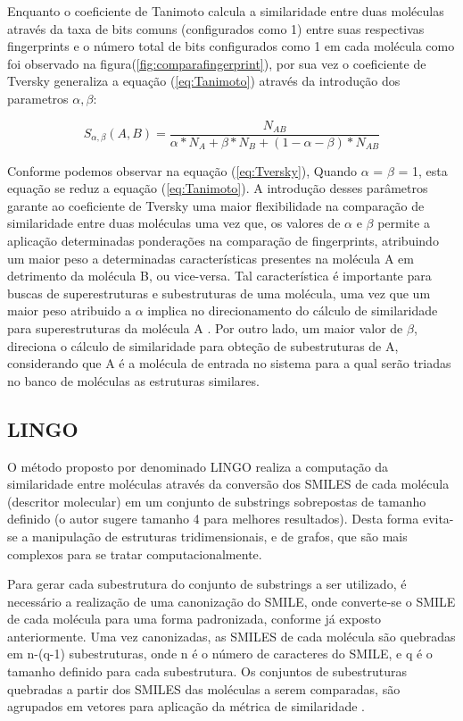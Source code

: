 Enquanto o coeficiente de Tanimoto calcula a similaridade entre duas moléculas através da taxa de bits comuns (configurados como 1) entre suas respectivas fingerprints   e o número total de bits configurados como 1 em cada molécula como foi observado na figura(\ref{fig:comparafingerprint}), por sua vez o coeficiente de Tversky generaliza a equação (\ref{eq:Tanimoto}) através da introdução dos parametros $\alpha,\beta$:


\begin{equation}
S_{\alpha,\beta}(A,B) =\frac{N_{AB}}{\alpha*N_{A}+\beta*N_{B}+(1-\alpha-\beta)*N_{AB}}
\label{eq:Tversky}
\end{equation}

Conforme podemos observar na equação (\ref{eq:Tversky}),  Quando $\alpha$ = $\beta$ = 1, esta equação se reduz a equação (\ref{eq:Tanimoto}). A introdução desses parâmetros garante ao coeficiente de Tversky uma maior flexibilidade na comparação de similaridade entre duas moléculas uma vez que, os valores de $\alpha$ e $\beta$ permite a aplicação determinadas ponderações na comparação de fingerprints, atribuindo um maior peso a determinadas características presentes na molécula A em detrimento da molécula B, ou vice-versa. Tal característica é importante para buscas de superestruturas e subestruturas de uma molécula, uma vez que um maior peso atribuido a $\alpha$ implica no direcionamento do cálculo de similaridade para superestruturas da molécula A \cite{swamidass2007bounds}. Por outro lado, um maior valor de $\beta$, direciona o cálculo de similaridade para obteção de subestruturas de A, considerando que A é a molécula de entrada no sistema para a qual serão triadas no banco de moléculas as estruturas similares.  

\subsection{LINGO}
O método proposto por \cite{vidal2005lingo} denominado LINGO realiza a computação da similaridade entre moléculas através da conversão dos SMILES de cada molécula (descritor molecular) em um conjunto de substrings sobrepostas de tamanho definido (o autor sugere tamanho 4 para melhores resultados). Desta forma evita-se a manipulação de estruturas tridimensionais, e de grafos, que são mais complexos para se tratar computacionalmente.

Para gerar cada subestrutura do conjunto de substrings a ser utilizado, é necessário a
realização de uma canonização do SMILE, onde converte-se o SMILE de cada molécula para 
uma forma padronizada, conforme já exposto anteriormente. Uma vez canonizadas, as 
SMILES de cada molécula são quebradas em n-(q-1) subestruturas, onde n é o número de 
caracteres do SMILE, e q é o tamanho definido para cada subestrutura. Os conjuntos de 
subestruturas quebradas a partir dos SMILES das moléculas a serem comparadas, são 
agrupados em vetores para aplicação da métrica de similaridade \cite{vidal2005lingo}.

